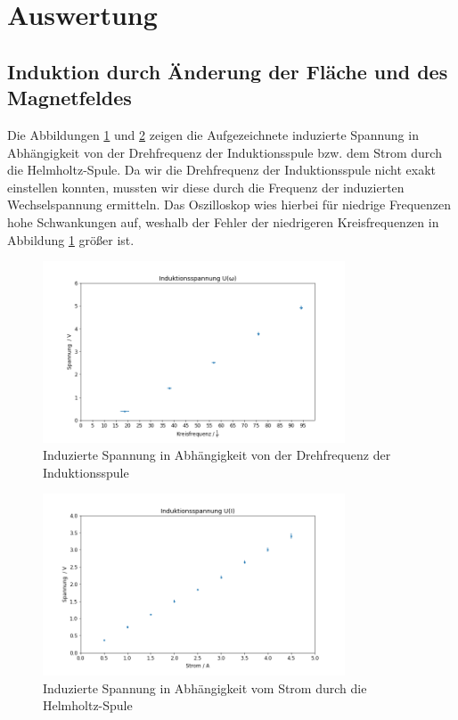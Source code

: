 \section{Auswertung}

\subsection{Induktion durch Änderung der Fläche und des Magnetfeldes}

Die Abbildungen \ref{plot:ui_by_omega} und \ref{plot:ui_by_i} zeigen die Aufgezeichnete induzierte Spannung in Abhängigkeit von der Drehfrequenz der Induktionsspule bzw. dem Strom durch die Helmholtz-Spule. Da wir die Drehfrequenz der Induktionsspule nicht exakt einstellen konnten, mussten wir diese durch die Frequenz der induzierten Wechselspannung ermitteln. Das Oszilloskop wies hierbei für niedrige Frequenzen hohe Schwankungen auf, weshalb der Fehler der niedrigeren Kreisfrequenzen in Abbildung \ref{plot:ui_by_omega} größer ist.

\begin{figure}[H]
    \centering
    \includegraphics[width=0.8\textwidth]{files/ui_by_omega.png}
    \caption{Induzierte Spannung in Abhängigkeit von der Drehfrequenz der Induktionsspule}
    \label{plot:ui_by_omega}
\end{figure}

\begin{figure}[H]
    \centering
    \includegraphics[width=0.8\textwidth]{files/ui_by_i.png}
    \caption{Induzierte Spannung in Abhängigkeit vom Strom durch die Helmholtz-Spule}
    \label{plot:ui_by_i}
\end{figure}

